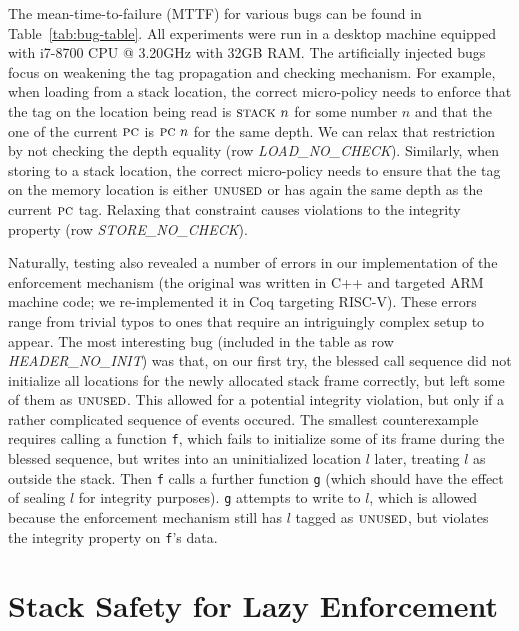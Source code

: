 \documentclass[acmsmall,review,anonymous]{acmart}\settopmatter{printfolios=true,printccs=false,printacmref=false}
\begin{document}
{The mean-time-to-failure (MTTF) for various bugs can be found in
Table~\ref{tab:bug-table}. All experiments were run in a desktop
machine equipped with i7-8700 CPU @ 3.20GHz with 32GB
RAM.
%
The artificially injected bugs focus on weakening the tag propagation
and checking mechanism.
%
For example, when loading from a stack location, the correct
micro-policy needs to enforce that the tag on the location being read
is $\textsc{stack} ~ n$ for some number $n$ and that the one of the
current $\textsc{pc}$ is $\textsc{pc} ~ n$ for the same depth. We can relax
that restriction by not checking the depth equality (row {\em
  LOAD\_NO\_CHECK}).
%
Similarly, when storing to a stack location, the correct micro-policy
needs to ensure that the tag on the memory location is either
$\textsc{unused}$ or has again the same depth as the current $\textsc{pc}$
tag. Relaxing that constraint causes violations to the integrity
property (row {\em STORE\_NO\_CHECK}).

Naturally, testing also revealed a number of errors in our
implementation of the enforcement mechanism (the original was written in C++
and targeted ARM machine code;
we re-implemented it in Coq targeting RISC-V).  These errors range
from trivial typos to ones that require an intriguingly complex setup
to appear.  The most interesting bug (included in the table as row
{\em HEADER\_NO\_INIT}) was that, on our first try, the blessed call
sequence %
did not initialize all locations for the
newly allocated stack frame correctly, but left some of them as
$\textsc{unused}$. This allowed for a potential integrity violation, but
only if a rather complicated sequence of events occured.
The smallest counterexample requires calling a function {\tt f},
which fails to initialize some of its frame during the blessed sequence,
but writes into an uninitialized location $l$ later, treating \(l\) as outside
the stack. Then {\tt f} calls a further function {\tt g} (which should have
the effect of sealing $l$ for integrity purposes). {\tt g} attempts to write to $l$,
which is allowed because the enforcement mechanism still has
$l$ tagged as $\textsc{unused}$, but violates the integrity property on {\tt f}'s data.

\section{Stack Safety for Lazy Enforcement}
\label{sec:lazy}

}
\end{document}
